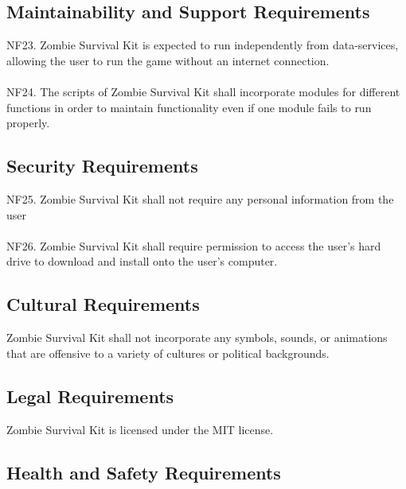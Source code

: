 \documentclass[12pt, titlepage]{article}
\begin{document}
\subsection{Maintainability and Support Requirements}

{\color{magenta} NF23.} Zombie Survival Kit is expected to run independently from data-services, allowing the user to run the game without an internet connection.
\\\\
{\color{magenta} NF24.} The scripts of Zombie Survival Kit shall incorporate modules for different functions in order to maintain functionality even if one module fails to run properly.

\subsection{Security Requirements}
{\color{magenta} NF25.} Zombie Survival Kit shall not require any personal information from the user
\\\\
{\color{magenta} NF26.} Zombie Survival Kit shall require permission to access the user’s hard drive to download and install onto the user’s computer.

\subsection{Cultural Requirements}
Zombie Survival Kit shall not incorporate any symbols, sounds, or animations that are offensive to a variety of cultures or political backgrounds.
\subsection{Legal Requirements}
Zombie Survival Kit is licensed under the MIT license.
\subsection{Health and Safety Requirements}
\end{document}
